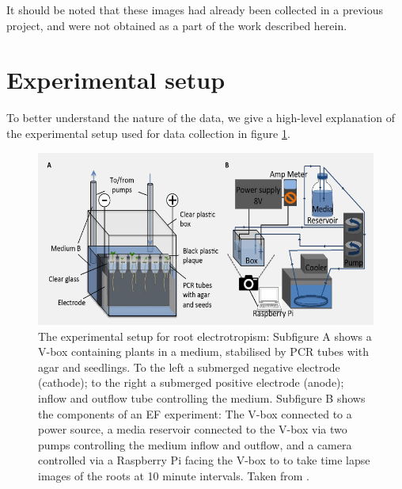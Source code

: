It should be noted that these images had already been collected in a previous project, and were not obtained as a part of the work described herein.


\section{Experimental setup}\label{sec:experiment}

To better understand the nature of the data, we give a high-level explanation of the experimental setup used for data collection in figure \ref{fig:experiment}.

\begin{figure}[H]
	\centering
	\includegraphics[width=\textwidth]{../Figures/experiment_circuit.png}
	\caption{The experimental setup for root electrotropism: 
		Subfigure A shows a V-box containing plants in a medium, stabilised by PCR tubes with agar and seedlings. To the left a submerged negative electrode (cathode); to the right a submerged positive electrode (anode); inflow and outflow tube controlling the medium. 
		Subfigure B shows the components of an EF experiment: The V-box connected to a power source, a media reservoir connected to the V-box via two pumps controlling the medium inflow and outflow, and a camera controlled via a Raspberry Pi facing the V-box to to take time lapse images of the roots at 10 minute intervals. 
		Taken from \cite{GExpCircuit}.}
	\label{fig:experiment}
\end{figure}




